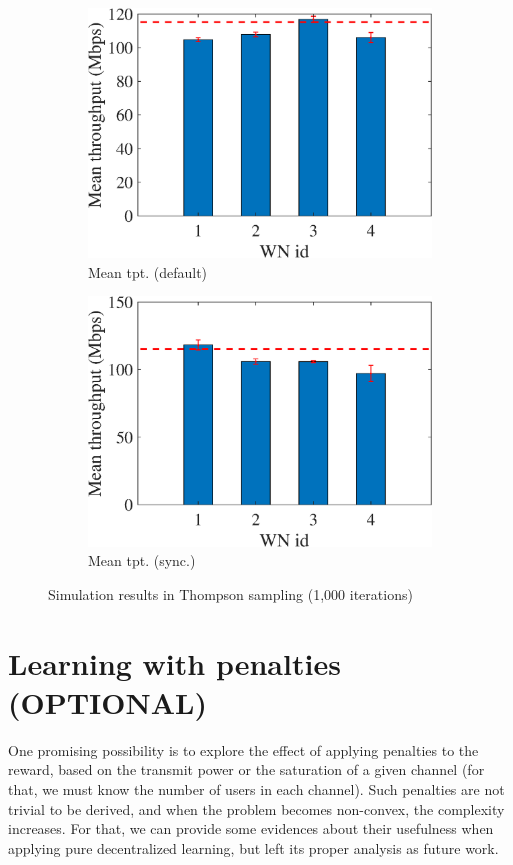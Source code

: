 \documentclass[preprint,12pt]{article}
\begin{document}
\begin{figure}[h!]
\begin{subfigure}[b]{.3\textwidth}
		\includegraphics[width=\textwidth]{images/mean_tpt_TS}
		\caption{Mean tpt. (default)}\label{fig:mean_tpt_TS}
	\end{subfigure}
	\begin{subfigure}[b]{.3\textwidth}
		\includegraphics[width=\textwidth]{images/mean_tpt_CTS}
		\caption{Mean tpt. (sync.)}\label{fig:mean_tpt_CTS}
	\end{subfigure}
	\caption{Simulation results in Thompson sampling (1,000 iterations)}
	\label{fig:ts}
\end{figure}

\section{Learning with penalties (OPTIONAL)}
One promising possibility is to explore the effect of applying penalties to the reward, based on the transmit power or the saturation of a given channel (for that, we must know the number of users in each channel). Such penalties are not trivial to be derived, and when the problem becomes non-convex, the complexity increases. For that, we can provide some evidences about their usefulness when applying pure decentralized learning, but left its proper analysis as future work.
\end{document}
